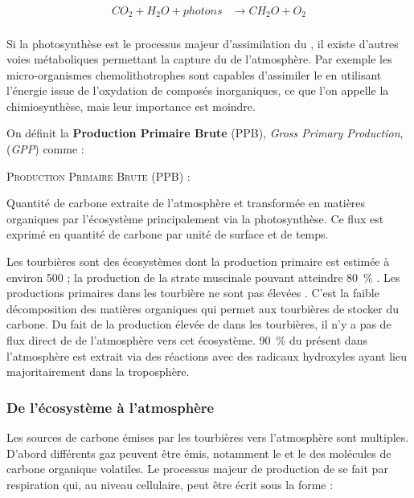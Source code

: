 $$\begin{aligned}
CO_{2} + H_{2}O + photons &\rightarrow CH_{2}O + O_{2}\\
\end{aligned} $$

Si la photosynthèse est le processus majeur d'assimilation du \coo, il existe d'autres voies métaboliques permettant la capture du \coo de l'atmosphère.
Par exemple les micro-organismes chemolithotrophes sont capables d'assimiler le \coo en utilisant l'énergie issue de l'oxydation de composés inorganiques, ce que l'on appelle la chimiosynthèse, mais leur importance est moindre.

On définit la \textbf{Production Primaire Brute} (PPB), \textit{Gross Primary Production}, (\textit{GPP}) comme :

\begin{pdef}
\textsc{Production Primaire Brute (PPB)} :

Quantité de carbone extraite de l'atmosphère et transformée en matières organiques par l'écosystème principalement via la photosynthèse.
Ce flux est exprimé en quantité de carbone par unité de surface et de temps.
\end{pdef}

Les tourbières sont des écosystèmes dont la production primaire est estimée à environ \SI{500}{\gcm} ;
la production de la strate muscinale pouvant atteindre \SI{80}{\percent} \citep{francez2000}.
Les productions primaires dans les tourbière ne sont pas élevées \plop.
C'est la faible décomposition des matières organiques qui permet aux tourbières de stocker du carbone.
Du fait de la production élevée de \chh dans les tourbières, il n'y a pas de flux direct de \chh de l'atmosphère vers cet écosystème.
\SI{90}{\percent} du \chh présent dans l'atmosphère est extrait via des réactions avec des radicaux hydroxyles ayant lieu majoritairement dans la troposphère.

\subsubsection{De l'écosystème à l'atmosphère}

Les sources de carbone émises par les tourbières vers l'atmosphère sont multiples.
D'abord différents gaz peuvent être émis, notamment le \coo et le \chh des molécules de carbone organique volatiles.
Le processus majeur de production de \coo se fait par respiration qui, au niveau cellulaire, peut être écrit sous la forme :


